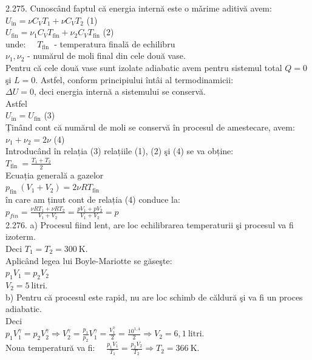 2.275. Cunoscând faptul că energia internă este o mǎrime aditivă avem:\\ $U_{\mathrm{in}}=\nu C_{V} T_{1}+\nu C_{V} T_{2}$ (1)\\ $U_{\mathrm{fin}}=\nu_{1} C_{V} T_{\mathrm{fin}}+\nu_{2} C_{V} T_{\mathrm{fin}}$ (2)\\ unde: $\quad T_{\text {fin }}$ - temperatura finală de echilibru\\ $\nu_{1}, \nu_{2}$ - numărul de moli final din cele două vase.\\ Pentru că cele două vase sunt izolate adiabatic avem pentru sistemul total $Q=0$ şi $L=0$. Astfel, conform principiului întâi al termodinamicii:\\ $\Delta U=0$, deci energia internă a sistemului se conservă.\\ Astfel\\ $U_{\mathrm{in}}=U_{\mathrm{fin}}$ (3)\\ Ținând cont că numărul de moli se conservă în procesul de amestecare, avem:\\ $\nu_{1}+\nu_{2}=2 \nu$ (4)\\ Introducând în relația (3) relațiile (1), (2) şi (4) se va obține:\\ $T_{\text {fin }}=\frac{T_{1}+T_{2}}{2}$\\ Ecuația generală a gazelor\\ $p_{\text {fin }}\left(V_{1}+V_{2}\right)=2 \nu R T_{\text {fin }}$\\ în care am ținut cont de relația (4) conduce la:\\ $p_{f i n}=\frac{\nu R T_{1}+\nu R T_{2}}{V_{1}+V_{2}}=\frac{p V_{1}+p V_{2}}{V_{1}+V_{2}}=p$\\

2.276. a) Procesul fiind lent, are loc echilibrarea temperaturii şi procesul va fi izoterm.\\ Deci $T_{1}=T_{2}=300 \mathrm{~K}$.\\ Aplicând legea lui Boyle-Mariotte se găseşte:\\ $p_{1} V_{1}=p_{2} V_{2}$\\ $V_{2}=5 \mathrm{~litri}$.\\ b) Pentru că procesul este rapid, nu are loc schimb de căldură şi va fi un proces adiabatic.\\ Deci\\ $p_{1} V_{1}^{\gamma}=p_{2} V_{2}^{\gamma} \Rightarrow V_{2}^{\gamma}=\frac{p_{1}}{p_{2}} V_{1}^{\gamma}=\frac{V_{1}^{\gamma}}{2}=\frac{10^{1,4}}{2} \Rightarrow V_{2}=6,1 \mathrm{~litri}$.\\ Noua temperatură va fi: $\quad \frac{p_{1} V_{1}}{T_{1}}=\frac{p_{2} V_{2}}{T_{2}} \Rightarrow T_{2}=366 \mathrm{~K}$.\\

